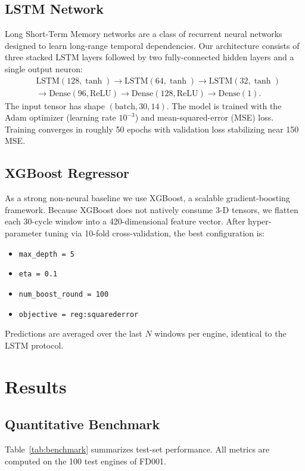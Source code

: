 \documentclass[11pt,a4paper]{article}
\begin{document}
\subsection{LSTM Network}
Long Short-Term Memory networks are a class of recurrent neural networks designed to learn long-range temporal dependencies. Our architecture consists of three stacked LSTM layers followed by two fully-connected hidden layers and a single output neuron:
\begin{align*}
&\text{LSTM}(128, \tanh) \rightarrow \text{LSTM}(64, \tanh) \rightarrow \text{LSTM}(32, \tanh) \\
&\rightarrow \text{Dense}(96, \text{ReLU}) \rightarrow \text{Dense}(128, \text{ReLU}) \rightarrow \text{Dense}(1).
\end{align*}
The input tensor has shape $(\text{batch}, 30, 14)$. The model is trained with the Adam optimizer (learning rate $10^{-3}$) and mean-squared-error (MSE) loss. Training converges in roughly 50 epochs with validation loss stabilizing near 150 MSE.

\subsection{XGBoost Regressor}
As a strong non-neural baseline we use XGBoost, a scalable gradient-boosting framework. Because XGBoost does not natively consume 3-D tensors, we flatten each 30-cycle window into a 420-dimensional feature vector. After hyper-parameter tuning via 10-fold cross-validation, the best configuration is:
\begin{itemize}
    \item \texttt{max\_depth = 5}
    \item \texttt{eta = 0.1}
    \item \texttt{num\_boost\_round = 100}
    \item \texttt{objective = reg:squarederror}
\end{itemize}
Predictions are averaged over the last $N$ windows per engine, identical to the LSTM protocol.

\section{Results}
\subsection{Quantitative Benchmark}
Table~\ref{tab:benchmark} summarizes test-set performance. All metrics are computed on the 100 test engines of FD001.
\end{document}
